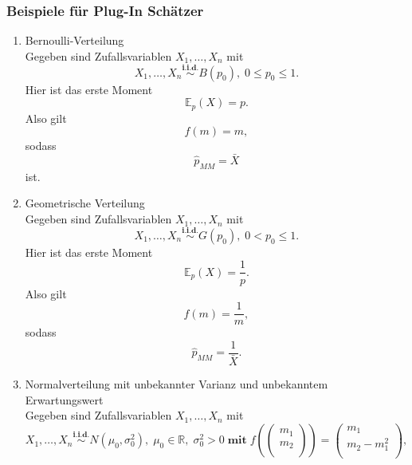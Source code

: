 \documentclass[10pt]{article}
\newcommand{\FZV}{X_1, \ldots, X_n} %
\newcommand{\IR}{\mathbb{R}} %
\newcommand{\EW}{\mathbb{E}} %
\begin{document}
\subsubsection{Beispiele für Plug-In Schätzer}
	\begin{enumerate}[label = (\roman*)]
	\item Bernoulli-Verteilung \\
	Gegeben sind Zufallsvariablen $\FZV$ mit
	\begin{equation*}
		\FZV \overset{\textbf{i.i.d.}}{\sim} B(p_0), \; 0 \leq p_0 \leq 1.
	\end{equation*} 
	Hier ist das erste Moment
	\begin{equation*}
		\EW_p(X)=p.
	\end{equation*}
	Also gilt
	\begin{equation*}
		f(m)=m,
	\end{equation*}
	sodass
	\begin{equation*}
		\hat{p}_{MM} = \bar{X} 
	\end{equation*}
	ist.
	
	\item Geometrische Verteilung \\
	Gegeben sind Zufallsvariablen $\FZV$ mit
	\begin{equation*}
		\FZV \overset{\textbf{i.i.d.}}{\sim} G(p_0), \; 0 < p_0 \leq 1.
	\end{equation*} 
	Hier ist das erste Moment
	\begin{equation*}
		\EW_p(X) = \frac{1}{p}.
	\end{equation*}
	Also gilt
	\begin{equation*}
		f(m)=\frac{1}{m},
	\end{equation*}
	sodass
	\begin{equation*}
		\hat{p}_{MM} = \frac{1}{\bar{X}}.
	\end{equation*}
	
	
	\item Normalverteilung mit unbekannter Varianz und unbekanntem Erwartungswert\\
	Gegeben sind Zufallsvariablen $\FZV$ mit
	\begin{equation*}
		\FZV \overset{\textbf{i.i.d.}} {\sim} N(\mu_0,\sigma_0^2),\; \mu_0 \in \IR, \; \sigma_0^2 >0 \; \textbf{mit} \; 	f(\left(
		\begin{array}{c}
			m_1\\
			m_2\\
		\end{array}
		\right)) = 
		\left(
		\begin{array}{c}
			m_1\\
			m_2 - m_1^2\\
		\end{array}
		\right),
	\end{equation*} 


\end{enumerate}
\end{document}
